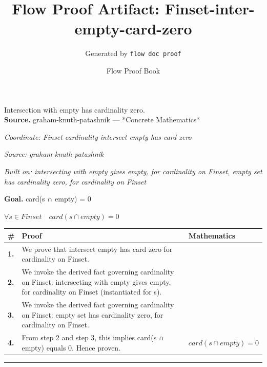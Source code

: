 \documentclass[11pt]{article}
\title{Flow Proof Artifact: Finset-inter-empty-card-zero}
\author{Generated by \texttt{flow doc proof}}
\date{Flow Proof Book}
\theoremstyle{definition}
\begin{document}
\maketitle
Intersection with empty has cardinality zero.\\[0.5em]
\textbf{Source.} graham-knuth-patashnik — *Concrete Mathematics*\\[0.5em]
\bigskip
{}\par
\smallskip\noindent\textit{Coordinate: Finset \cdot cardinality \cdot intersect empty has card zero}\par
\smallskip\noindent\textit{Source: graham-knuth-patashnik}\par
\smallskip\noindent\textit{Built on: intersecting with empty gives empty, for cardinality on Finset, empty set has cardinality zero, for cardinality on Finset}\par
\medskip
\noindent\textbf{Goal.} card(s ∩ empty) = 0\par
\noindent$\displaystyle \forall s \in Finset\quad card(s ∩ empty) = 0$\par
\medskip
\noindent
\begin{tabular}{@{} >{\raggedright\arraybackslash}p{} >{\raggedright\arraybackslash}p{} >{\raggedleft\arraybackslash}p{} @{}}
\textbf{\#} & \textbf{Proof} & \textbf{Mathematics} \\
\midrule
\textbf{1.} & We prove that intersect empty has card zero for cardinality on Finset. & \\[0.45em]
\textbf{2.} & We invoke the derived fact governing cardinality on Finset: intersecting with empty gives empty, for cardinality on Finset (instantiated for s). & \\[0.45em]
\textbf{3.} & We invoke the derived fact governing cardinality on Finset: empty set has cardinality zero, for cardinality on Finset. & \\[0.45em]
\textbf{4.} & From step 2 and step 3, this implies card(s ∩ empty) equals 0. Hence proven. & $\displaystyle card(s ∩ empty) = 0$ \\[0.45em]
\bottomrule
\end{tabular}
\label{thm:Finset-cardinality-intersect_empty_has_card_zero}
\par\medskip\hrule
\end{document}

